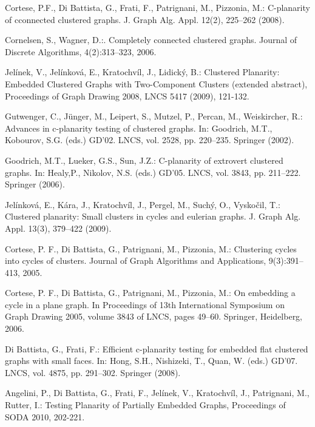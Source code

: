 \begin{thebibliography}{9}

	Cortese, P.F., Di Battista, G., Frati, F., Patrignani, M., Pizzonia, M.: C-planarity of cconnected clustered graphs. J. Graph Alg. Appl. 12(2), 225–262 (2008).

	Cornelsen, S., Wagner, D.:. Completely connected clustered graphs. Journal of Discrete Algorithms, 4(2):313–323, 2006.

	Jelínek, V., Jelínková, E., Kratochvíl, J., Lidický, B.: Clustered Planarity: Embedded Clustered Graphs with Two-Component Clusters (extended abstract), Proceedings of Graph Drawing 2008, LNCS 5417 (2009), 121-132.

	Gutwenger, C., Jünger, M., Leipert, S., Mutzel, P., Percan, M., Weiskircher, R.: Advances in c-planarity testing of clustered graphs. In: Goodrich, M.T., Kobourov, S.G. (eds.) GD’02. LNCS, vol. 2528, pp. 220–235. Springer (2002).

	Goodrich, M.T., Lueker, G.S., Sun, J.Z.: C-planarity of extrovert clustered graphs. In: Healy,P., Nikolov, N.S. (eds.) GD’05. LNCS, vol. 3843, pp. 211–222. Springer (2006).

	Jelínková, E., Kára, J., Kratochvíl, J., Pergel, M., Suchý, O., Vyskočil, T.: Clustered planarity: Small clusters in cycles and eulerian graphs. J. Graph Alg. Appl. 13(3), 379–422 (2009).

	Cortese, P. F., Di Battista, G., Patrignani, M., Pizzonia, M.: Clustering cycles into cycles of clusters. Journal of Graph Algorithms and Applications, 9(3):391–413, 2005.

	Cortese, P. F., Di Battista, G., Patrignani, M., Pizzonia, M.: On embedding a cycle in a plane graph. In Proceedings of 13th International Symposium on Graph Drawing 2005, volume 3843 of LNCS, pages 49–60. Springer, Heidelberg, 2006.

	Di Battista, G., Frati, F.: Efficient c-planarity testing for embedded flat clustered graphs with small faces. In: Hong, S.H., Nishizeki, T., Quan, W. (eds.) GD’07. LNCS, vol. 4875, pp. 291–302. Springer (2008).

	Angelini, P., Di Battista, G., Frati, F., Jelínek, V., Kratochvíl, J., Patrignani, M., Rutter, I.: Testing Planarity of Partially Embedded Graphs, Proceedings of SODA 2010, 202-221.


\end{thebibliography}
